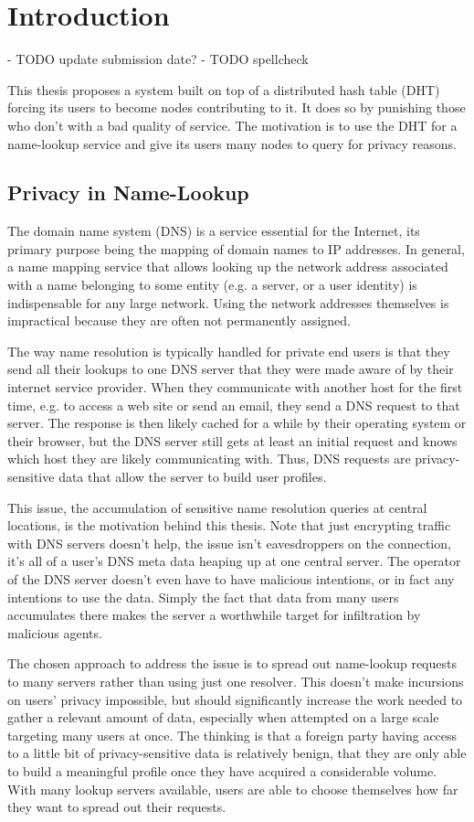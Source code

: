 \chapter{Introduction}
- TODO update submission date?
- TODO spellcheck

This thesis proposes a system built on top of a distributed hash table (DHT)
forcing its users to become nodes contributing to it. It does so by punishing
those who don't with a bad quality of service. The motivation is to use the DHT
for a name-lookup service and give its users many nodes to query for privacy
reasons.

\section{Privacy in Name-Lookup}
The domain name system (DNS) is a service essential for the Internet, its
primary purpose being the mapping of domain names to IP addresses. In general, a
name mapping service that allows looking up the network address associated with
a name belonging to some entity (e.g. a server, or a user identity) is
indispensable for any large network. Using the network addresses themselves is
impractical because they are often not permanently assigned.

The way name resolution is typically handled for private end users is that they
send all their lookups to one DNS server that they were made aware of by their
internet service provider. When they communicate with another host for the first
time, e.g. to access a web site or send an email, they send a DNS request to
that server. The response is then likely cached for a while by their
operating system or their browser, but the DNS server still gets at least an
initial request and knows which host they are likely communicating with. Thus,
DNS requests are privacy-sensitive data that allow the server to build user
profiles.

This issue, the accumulation of sensitive name resolution queries at central
locations, is the motivation behind this thesis. Note that just encrypting
traffic with DNS servers doesn't help, the issue isn't eavesdroppers on the
connection, it's all of a user's DNS meta data heaping up at one central server.
The operator of the DNS server doesn't even have to have malicious intentions,
or in fact any intentions to use the data. Simply the fact that data from many
users accumulates there makes the server a worthwhile target for infiltration by
malicious agents.

The chosen approach to address the issue is to spread out name-lookup requests
to many servers rather than using just one resolver. This doesn't make
incursions on users' privacy impossible, but should significantly increase the
work needed to gather a relevant amount of data, especially when attempted on a
large scale targeting many users at once. The thinking is that a foreign party
having access to a little bit of privacy-sensitive data is relatively benign,
that they are only able to build a meaningful profile once they have acquired a
considerable volume. With many lookup servers available, users are able to
choose themselves how far they want to spread out their requests.

